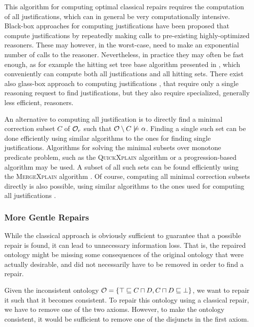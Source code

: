 This algorithm for computing optimal classical repairs requires the computation of all justifications, which can in general be very computationally intensive. Black-box approaches for computing justifications have been proposed \cite{kalyanpur2007finding,schlobach2003non,schlobach2007debugging} that compute justifications by repeatedly making calls to pre-existing highly-optimized reasoners. These may however, in the worst-case, need to make an exponential number of calls to the reasoner. Nevertheless, in practice they may often be fast enough, as for example the hitting set tree base algorithm presented in \cite{kalyanpur2007finding}, which conveniently can compute both all justifications and all hitting sets. There exist also glass-box approach to computing justifications \cite{kalyanpur2007finding}, that require only a single reasoning request to find justifications, but they also require specialized, generally less efficient, reasoners.

An alternative to computing all justification is to directly find a minimal correction subset $C$ of $\mathcal{O}_r$ such that $\mathcal{O} \setminus C \not\models \alpha$. Finding a single such set can be done efficiently using similar algorithms to the ones for finding single justifications. Algorithms for solving the minimal subsets over monotone predicate problem, such as the \textsc{QuickXplain} algorithm \cite{junker2004preferred} or a progression-based algorithm \cite{marques2013minimal} may be used. A subset of all such sets can be found efficiently using the \textsc{MergeXplain} algorithm \cite{shchekotykhin2015mergexplain}. Of course, computing all minimal correction subsets directly is also possible, using similar algorithms to the ones used for computing all justifications \cite{malouf2007maximal}.

\subsubsection{More Gentle Repairs} \label{more-gentle-repairs}

While the classical approach is obviously sufficient to guarantee that a possible repair is found, it can lead to unnecessary information loss. That is, the repaired ontology might be missing some consequences of the original ontology that were actually desirable, and did not necessarily have to be removed in order to find a repair.

\begin{example}
  Given the inconsistent ontology $\mathcal{O} = \{ \top \sqsubseteq C \sqcap D, C \sqcap D \sqsubseteq \bot \}$, we want to repair it such that it becomes consistent. To repair this ontology using a classical repair, we have to remove one of the two axioms. However, to make the ontology consistent, it would be sufficient to remove one of the disjuncts in the first axiom.
\end{example}

